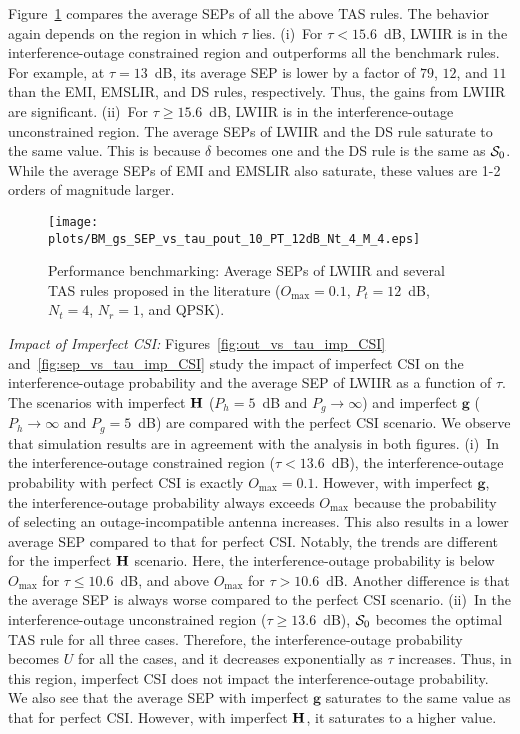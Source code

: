 \documentclass[12pt,draftcls,peerreview,onecolumn]{IEEEtran}
\newcommand{\tendsto}{\to}
\newcommand{\mtx}[1]{{\bf #1}} %
\newcommand{\Nt}{{N_t}}
\newcommand{\Nr}{{N_r}}
\newcommand{\Pt}{{P_t}}
\newcommand{\puch}{g}
\newcommand{\g}{\mathbf{\puch}}
\newcommand{\outmax}{O_{\text{max}}}
\newcommand{\itau}{\tau}
\newcommand{\un}{U}
\newcommand{\Hmx}{\mtx{H}}
\newcommand{\caluncons}{{\cal S_{\text{0}}}}
\newcommand{\gpilotpower}{P_g}
\newcommand{\hpilotpower}{P_h}
\begin{document}
Figure~\ref{fig:BM_SEP_vs_tau} compares the average SEPs of all the above TAS rules. The behavior again depends on the region in which $\itau$ lies. (i)~For $\itau < 15.6$~dB, LWIIR is in the interference-outage constrained region and outperforms all the benchmark rules. For example, at $\itau=13$~dB,  its average SEP is lower by a factor of $79$, $12$, and $11$ than the EMI, EMSLIR, and DS rules, respectively. Thus, the gains from LWIIR are significant. (ii)~For $\itau \geq 15.6$~dB, LWIIR is in the interference-outage unconstrained region. The average SEPs of LWIIR and the DS rule saturate to the same value. This is because $\delta$ becomes one and the DS rule is the same as $\caluncons$. While the average SEPs of EMI and EMSLIR also saturate, these values are 1-2 orders of magnitude larger. 



\begin{figure}
	\centering \texttt{[image: plots/BM\_gs\_SEP\_vs\_tau\_pout\_10\_PT\_12dB\_Nt\_4\_M\_4.eps]}
	\caption{Performance benchmarking: Average SEPs of LWIIR and several TAS rules proposed in the literature ($\outmax = 0.1$, $\Pt = 12$~dB, $\Nt = 4$, $\Nr=1$, and QPSK).}
	\label{fig:BM_SEP_vs_tau}
\end{figure}


{\em Impact of Imperfect CSI:} Figures~\ref{fig:out_vs_tau_imp_CSI} and~\ref{fig:sep_vs_tau_imp_CSI} study the impact of imperfect CSI on the interference-outage probability and the average SEP of LWIIR as a function of $\tau$. The scenarios with imperfect $\Hmx$ ($\hpilotpower=5$~dB and $\gpilotpower\tendsto\infty$) and imperfect $\g$ ($\hpilotpower\tendsto\infty$ and $\gpilotpower=5$~dB) are compared with the perfect CSI scenario. We observe that simulation results are in agreement with the analysis in both figures. (i)~In the interference-outage constrained region ($\itau<13.6$~dB), the interference-outage probability with perfect CSI is exactly $\outmax=0.1$. However, with imperfect $\g$, the interference-outage probability always exceeds  $\outmax$ because the probability of selecting an outage-incompatible antenna increases. This also results in a  lower average SEP compared to that for perfect CSI. Notably, the trends are different for the imperfect $\Hmx$ scenario. Here, the interference-outage probability is below $\outmax$ for $\itau\leq10.6$~dB, and above $\outmax$ for $\itau>10.6$~dB. Another difference is that the average SEP is always worse compared to the perfect CSI scenario. (ii)~In the interference-outage unconstrained region ($\itau \geq 13.6$~dB),  $\caluncons$ becomes the optimal TAS rule for all three cases. Therefore, the 
interference-outage probability becomes $\un$ for all the cases, and it decreases exponentially as $\itau$ increases. Thus, in this region, imperfect CSI does not impact the interference-outage probability. We also see that the average SEP with imperfect $\g$ saturates to the same value as that for perfect CSI. However, with imperfect $\Hmx$, it saturates to a higher value. %
\end{document}
